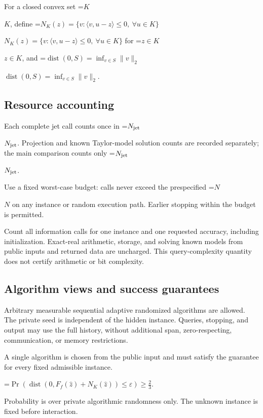 \documentclass[10pt,a4paper]{article}
\newcommand{\AtlasMath}[1]{\par\begingroup\centering\setbox0=\hbox{$\displaystyle #1$}\ifdim\wd0>1.4\linewidth\typeout{ATLAS WIDE FORMULA: \the\wd0}\fi\ifdim\wd0>\linewidth\resizebox{\linewidth}{!}{\box0}\else\box0\fi\par\endgroup}
\newcommand{\AtlasInlineMath}[1]{\begingroup\setbox0=\hbox{$#1$}\ifdim\wd0>.4\linewidth\endgroup\AtlasMath{#1}\else\endgroup$#1$\fi}
\begin{document}
For a closed convex set \AtlasInlineMath{K}, define \AtlasInlineMath{N_K(z)=\{v:\langle v,u-z\rangle\le0,\ \forall u\in K\}} for \AtlasInlineMath{z\in K}, and \AtlasInlineMath{\operatorname{dist}(0,S)=\inf_{v\in S}\|v\|_2}.



\subsection{Resource accounting}


Each complete jet call counts once in \AtlasInlineMath{N_{\rm jet}}. Projection and known Taylor-model solution counts are recorded separately; the main comparison counts only \AtlasInlineMath{N_{\rm jet}}.



Use a fixed worst-case budget: calls never exceed the prespecified \AtlasInlineMath{N} on any instance or random execution path. Earlier stopping within the budget is permitted.



Count all information calls for one instance and one requested accuracy, including initialization. Exact-real arithmetic, storage, and solving known models from public inputs and returned data are uncharged. This query-complexity quantity does not certify arithmetic or bit complexity.



\subsection{Algorithm views and success guarantees}


Arbitrary measurable sequential adaptive randomized algorithms are allowed. The private seed is independent of the hidden instance. Queries, stopping, and output may use the full history, without additional span, zero-respecting, communication, or memory restrictions.



A single algorithm is chosen from the public input and must satisfy the guarantee for every fixed admissible instance.




\AtlasMath{\Pr\!\left(\operatorname{dist}(0,F_f(\widehat{z})+N_K(\widehat{z}))\le\varepsilon\right)\ge\frac23.}




Probability is over private algorithmic randomness only. The unknown instance is fixed before interaction.
\end{document}

